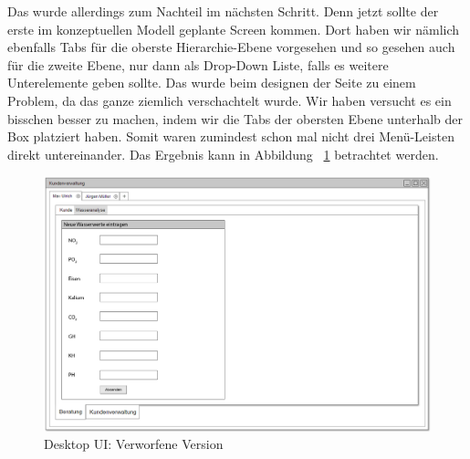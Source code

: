 Das wurde allerdings zum Nachteil im nächsten Schritt. Denn jetzt sollte der erste im konzeptuellen Modell geplante Screen kommen. Dort haben wir nämlich ebenfalls Tabs für die oberste Hierarchie-Ebene vorgesehen und so gesehen auch für die zweite Ebene, nur dann als Drop-Down Liste, falls es weitere Unterelemente geben sollte. Das wurde beim designen der Seite zu einem Problem, da das ganze ziemlich verschachtelt wurde. Wir haben versucht es ein bisschen besser zu machen, indem wir die Tabs der obersten Ebene unterhalb der Box platziert haben. Somit waren zumindest schon mal nicht drei Menü-Leisten direkt untereinander. Das Ergebnis kann in Abbildung 
~\ref{desktopUI:0} betrachtet werden.

\begin{figure}[ht!]
\centering
\includegraphics[width=\linewidth]{0Version1}
\caption{Desktop UI: Verworfene Version}
\label{desktopUI:0}
\end{figure}

